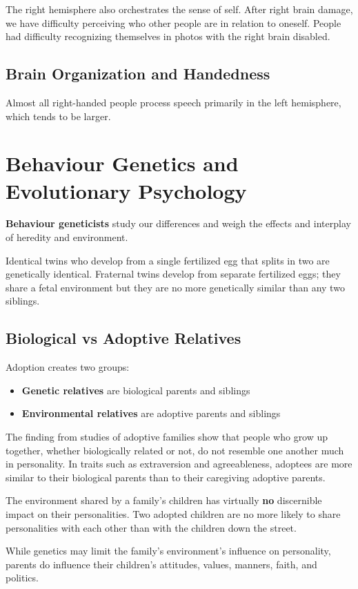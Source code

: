 \documentclass[12pt]{article}
\begin{document}
The right hemisphere also orchestrates the sense of self. After right brain damage, we have difficulty perceiving who other people are in relation to oneself. People had difficulty recognizing themselves in photos with the right brain disabled.

\subsection*{Brain Organization and Handedness}
Almost all right-handed people process speech primarily in the left hemisphere, which tends to be larger.

\section*{Behaviour Genetics and Evolutionary Psychology}
\textbf{Behaviour geneticists} study our differences and weigh the effects and interplay of heredity and environment.

Identical twins who develop from a single fertilized egg that splits in two are genetically identical. Fraternal twins develop from separate fertilized eggs; they share a fetal environment but they are no more genetically similar than any two siblings.

\subsection*{Biological vs Adoptive Relatives}
Adoption creates two groups:
\begin{itemize}
\item {\bf Genetic relatives} are biological parents and siblings
\item {\bf Environmental relatives} are adoptive parents and siblings
\end{itemize}

The finding from studies of adoptive families show that people who grow up together, whether biologically related or not, do not resemble one another much in personality.  In traits such as extraversion and agreeableness, adoptees are more similar to their biological parents than to their caregiving adoptive parents.

The environment shared by a family's children has virtually \textbf{no} discernible impact on their personalities. Two adopted children are no more likely to share personalities with each other than with the children down the street.

While genetics may limit the family's environment's influence on personality, parents do influence their children's attitudes, values, manners, faith, and politics.
\end{document}
